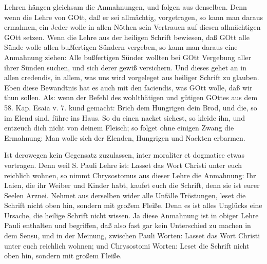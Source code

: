 
Lehren hängen gleichsam die Anmahnungen, und folgen aus denselben. Denn wenn die Lehre von GOtt, daß er sei allmächtig, vorgetragen, so kann man daraus ermahnen, ein Jeder wolle in allen Nöthen sein Vertrauen auf diesen allmächtigen GOtt setzen. Wenn die Lehre aus der heiligen Schrift bewiesen, daß GOtt alle Sünde wolle allen bußfertigen Sündern vergeben, so kann man daraus eine Anmahnung ziehen: Alle bußfertigen Sünder wollten bei GOtt Vergebung aller ihrer Sünden suchen, und sich derer gewiß versichern. Und dieses gehet an in allen credendis, in allem, was uns wird vorgeleget aus heiliger Schrift zu glauben. Eben diese Bewandtnis hat es auch mit den faciendis, was GOtt wolle, daß wir thun sollen. Als: wenn der Befehl des wohlthätigen und gütigen GOttes aus dem 58. Kap. Esaia v. 7. kund gemacht: Brich dem Hungrigen dein Brod, und die, so im Elend sind, führe ins Haus. So du einen nacket siehest, so kleide ihn, und entzeuch dich nicht von deinem Fleisch; so folget ohne einigen Zwang die Ermahnung: Man wolle sich der Elenden, Hungrigen und Nackten erbarmen.

Ist derowegen kein Gegensatz zuzulassen, inter moraliter et dogmatice etwas vortragen. Denn weil S. Pauli Lehre ist: Lasset das Wort Christi unter euch reichlich wohnen, so nimmt Chrysostomus aus dieser Lehre die Anmahnung: Ihr Laien, die ihr Weiber und Kinder habt, kaufet euch die Schrift, denn sie ist eurer Seelen Arznei. Nehmet aus derselben wider alle Unfälle Tröstungen, leset die Schrift nicht oben hin, sondern mit großem Fleiße. Denn es ist alles Unglücks eine Ursache, die heilige Schrift nicht wissen. Ja diese Anmahnung ist in obiger Lehre Pauli enthalten und begriffen, daß also fast gar kein Unterschied zu machen in dem Sensu, und in der Meinung, zwischen Pauli Worten: Lasset das Wort Christi unter euch reichlich wohnen; und Chrysostomi Worten: Leset die Schrift nicht oben hin, sondern mit großem Fleiße.

